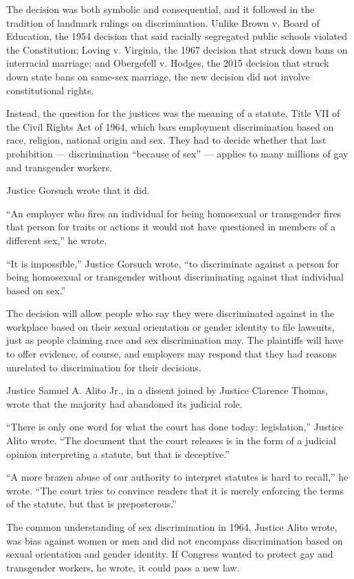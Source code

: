 The decision was both symbolic and consequential, and it followed in the
tradition of landmark rulings on discrimination. Unlike Brown v. Board
of Education, the 1954 decision that said racially segregated public
schools violated the Constitution; Loving v. Virginia, the 1967 decision
that struck down bans on interracial marriage; and Obergefell v. Hodges,
the 2015 decision that struck down state bans on same-sex marriage, the
new decision did not involve constitutional rights.

Instead, the question for the justices was the meaning of a statute,
Title VII of the Civil Rights Act of 1964, which bars employment
discrimination based on race, religion, national origin and sex. They
had to decide whether that last prohibition --- discrimination ``because
of sex'' --- applies to many millions of gay and transgender workers.

Justice Gorsuch wrote that it did.

``An employer who fires an individual for being homosexual or
transgender fires that person for traits or actions it would not have
questioned in members of a different sex,'' he wrote.

``It is impossible,'' Justice Gorsuch wrote, ``to discriminate against a
person for being homosexual or transgender without discriminating
against that individual based on sex.''

The decision will allow people who say they were discriminated against
in the workplace based on their sexual orientation or gender identity to
file lawsuits, just as people claiming race and sex discrimination may.
The plaintiffs will have to offer evidence, of course, and employers may
respond that they had reasons unrelated to discrimination for their
decisions.

Justice Samuel A. Alito Jr., in a dissent joined by Justice Clarence
Thomas, wrote that the majority had abandoned its judicial role.

``There is only one word for what the court has done today:
legislation,'' Justice Alito wrote. ``The document that the court
releases is in the form of a judicial opinion interpreting a statute,
but that is deceptive.''

``A more brazen abuse of our authority to interpret statutes is hard to
recall,'' he wrote. ``The court tries to convince readers that it is
merely enforcing the terms of the statute, but that is preposterous.''

The common understanding of sex discrimination in 1964, Justice Alito
wrote, was bias against women or men and did not encompass
discrimination based on sexual orientation and gender identity. If
Congress wanted to protect gay and transgender workers, he wrote, it
could pass a new law.


